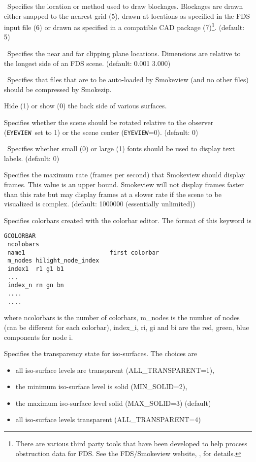 \documentclass[11pt,twoside]{book}
\newcommand{\hitemNULL}[1]{}
\begin{document}
{\ Specifies the location or method used to
draw blockages.  Blockages are drawn either snapped to the nearest
grid (5), drawn at locations as specified in the FDS input file
(6) or drawn as specified in a compatible CAD package (7)\footnote{There are various
third party tools that have been developed to help process obstruction data for FDS. See
the FDS/Smokeview website, , for details.}.   (default: 5)

\hitemNULL{BOUNDARYTWOSIDE}

\ Specifies the near and far clipping plane
locations.  Dimensions are relative to the longest side of
an FDS scene. (default: 0.001 3.000)

\hitemNULL{CONTOURTYPE}

\ Specifies that files that are to be auto-loaded
by Smokeview (and no other files) should be compressed by Smokezip.

Hide (1) or show (0) the back side of various surfaces.

Specifies whether
the scene should be rotated relative to the observer ({\tt EYEVIEW}\ set to 1)
or the scene center ({\tt EYEVIEW}=0).
(default: 0)

\ Specifies whether small (0) or large (1)
fonts should be used to display text labels. (default: 0)

Specifies the maximum rate (frames per
second) that Smokeview should display frames. This value is an
upper bound.  Smokeview will not display frames faster than this
rate but may display frames at a slower rate if the scene to be
visualized is complex. (default: 1000000 (essentially unlimited))

Specifies colorbars created with the colorbar editor.
The format of this keyword is
\begin{lstlisting}
GCOLORBAR
 ncolobars
 name1                        first colorbar
 m_nodes hilight_node_index
 index1  r1 g1 b1
 ...
 index_n rn gn bn
 ....
 ....

\end{lstlisting}
where ncolorbars is the number of colorbars, m\_nodes is the number of nodes
(can be different for each colorbar), index\_i, ri, gi and bi are the red, green, blue components for
node i.


Specifies the transparency state for iso-surfaces. The choices
are
\begin{itemize}
\item all iso-surface levels are transparent (ALL\_TRANSPARENT=1),
\item the minimum iso-surface level is solid (MIN\_SOLID=2),
\item the maximum iso-surface level solid (MAX\_SOLID=3) (default)
\item all iso-surface levels transparent (ALL\_TRANSPARENT=4)
\end{itemize}


}
\end{document}
